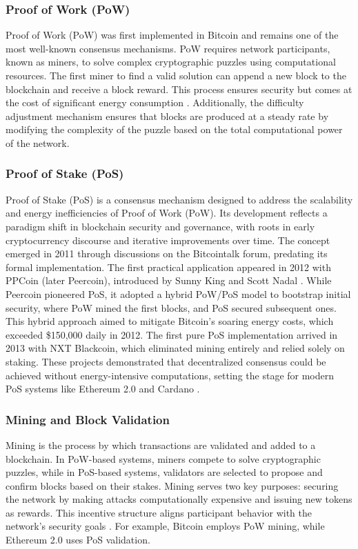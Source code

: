 \documentclass{article}
\begin{document}
\subsubsection{Proof of Work (PoW)}

Proof of Work (PoW) was first implemented in Bitcoin \cite{nakamoto2012bitcoin} and remains one of the most well-known consensus mechanisms. PoW requires network participants, known as miners, to solve complex cryptographic puzzles using computational resources. The first miner to find a valid solution can append a new block to the blockchain and receive a block reward. This process ensures security but comes at the cost of significant energy consumption \cite{narayanan2016bitcoin}. Additionally, the difficulty adjustment mechanism ensures that blocks are produced at a steady rate by modifying the complexity of the puzzle based on the total computational power of the network.

\subsubsection{Proof of Stake (PoS)}

Proof of Stake (PoS) is a consensus mechanism designed to address the scalability and energy inefficiencies of Proof of Work (PoW). Its development reflects a paradigm shift in blockchain security and governance, with roots in early cryptocurrency discourse and iterative improvements over time. The concept emerged in 2011 through discussions on the Bitcointalk forum, predating its formal implementation. The first practical application appeared in 2012 with PPCoin (later Peercoin), introduced by Sunny King and Scott Nadal \cite{king2012ppcoin}. While Peercoin pioneered PoS, it adopted a hybrid PoW/PoS model to bootstrap initial security, where PoW mined the first blocks, and PoS secured subsequent ones. This hybrid approach aimed to mitigate Bitcoin’s soaring energy costs, which exceeded \$150,000 daily in 2012. The first pure PoS implementation arrived in 2013 with NXT Blackcoin, which eliminated mining entirely and relied solely on staking. These projects demonstrated that decentralized consensus could be achieved without energy-intensive computations, setting the stage for modern PoS systems like Ethereum 2.0 \cite{buterin2020ghost}and Cardano \cite{kiayias2017ouroboros}.


\subsubsection{Mining and Block Validation}
Mining is the process by which transactions are validated and added to a blockchain. In PoW-based systems, miners compete to solve cryptographic puzzles, while in PoS-based systems, validators are selected to propose and confirm blocks based on their stakes. Mining serves two key purposes: securing the network by making attacks computationally expensive and issuing new tokens as rewards. This incentive structure aligns participant behavior with the network’s security goals \cite{bonneau2015sok}. For example, Bitcoin employs PoW mining, while Ethereum 2.0 uses PoS validation.
\end{document}
